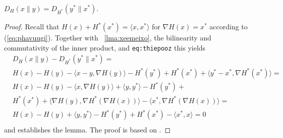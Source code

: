 \documentclass[12pt]{article}
\begin{document}
\begin{lemma}
  \label{lma:ohviomov}
$D_{H}(x\|y)=D_{H^{\ast}}\left(y^{\ast}\|x^{\ast}\right)$.
\end{lemma}
\begin{proof}
  \label{prf:keeseiph}
  Recall that $H(x)+H^{\ast}(x^{\ast})=\langle{}x,x^{\ast}\rangle$ for
  $\nabla{}H(x)=x^{\ast}$ according to (\ref{eq:phavuugi}). Together
  with {\emma}~\ref{lma:xeemeixo}, the bilinearity and commutativity of
  the inner product, and \texttt{eq:thiepooz} this yields
\begin{equation}
  \label{eq:chahgheo}
  \begin{split}
& D_{H}(x\|y)-D_{H^{\ast}}\left(y^{\ast}\|x^{\ast}\right)= \\
& H(x)-H(y)-\langle{}x-y,\nabla{}H(y)\rangle-H^{\ast}(y^{\ast})+H^{\ast}(x^{\ast})+\langle{}y^{\ast}-x^{\ast},\nabla{}H^{\ast}(x^{\ast})\rangle= \\
& H(x)-H(y)-\langle{}x,\nabla{}H(y)\rangle+\langle{}y,y^{\ast}\rangle-H^{\ast}(y^{\ast})+ \\
& H^{\ast}(x^{\ast})+\langle{}\nabla{}H(y),\nabla{}H^{\ast}(\nabla{}H(x))\rangle-\langle{}x^{\ast},\nabla{}H^{\ast}(\nabla{}H(x))\rangle= \\
& H(x)-H(y)+\langle{}y,y^{\ast}\rangle-H^{\ast}(y^{\ast})+H^{\ast}(x^{\ast})-\langle{}x^{\ast},x\rangle=0 \\
  \end{split}
\end{equation}
and establishes the lemma. The proof is based on .
\end{proof}
\end{document}
